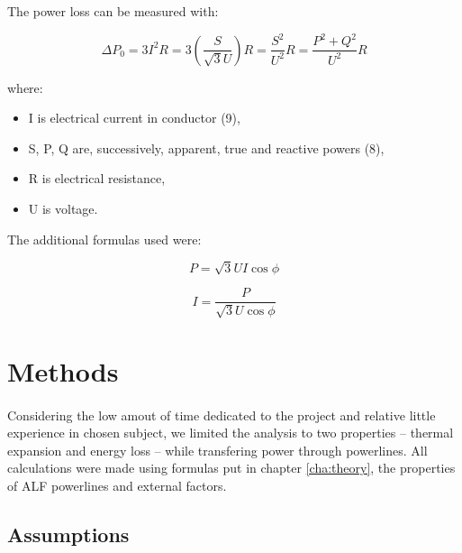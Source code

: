 \documentclass[a4paper]{article}
\begin{document}
The power loss can be measured with:

\begin{equation}
\Delta P_0 = 3I^{2}R = 3\left(\frac {S}{\sqrt{3}U}\right) R = \frac {S^{2}}{U^{2}} R = \frac {P^{2} + Q^{2}}{U^{2}} R
\end{equation}

where:
\begin{itemize}
	\setlength{\itemsep}{1pt}
	\setlength{\parskip}{0pt}
	\setlength{\parsep}{0pt}
\item I is electrical current in conductor (9),
\item S, P, Q are, successively, apparent, true and reactive powers (8),
\item R is electrical resistance,
\item U is voltage.
\end{itemize}

The additional formulas used were:

\begin{equation}
P = \sqrt{3}UI\cos{\phi}
\end{equation}

\begin{equation}
I = \frac {P}{\sqrt{3}U\cos{\phi}}
\end{equation}

\clearpage

%
\section{Methods}
\label{cha:methods}
\paragraph{}
Considering the low amout of time dedicated to the project and relative little experience in chosen subject, we limited the analysis to two properties -- thermal expansion and energy loss -- while transfering power through powerlines. All calculations were made using formulas put in chapter \ref{cha:theory}, the properties of ALF powerlines and external factors.

\subsection{Assumptions}
\label{sec:assumptions}
\paragraph{}
\end{document}
